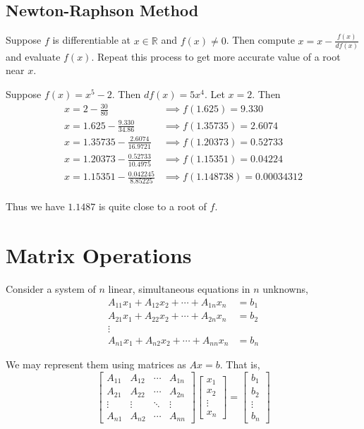 \subsection{Newton-Raphson Method}
	Suppose $f$ is differentiable at $x \in \mathbb{R}$ and $f(x) \ne 0$.
	Then compute $x = x - \frac{f(x)}{df(x)}$ and evaluate $f(x)$.
	Repeat this process to get more accurate value of a root near $x$.

\begin{remark}
	Suppose $f(x) = x^5 - 2$.
	Then $df(x) = 5x^4$.
	Let $x = 2$.
	Then
	\begin{align*}
		x = 2 - \frac{30}{80} & \implies f(1.625) = 9.330 \\
		x = 1.625 - \frac{9.330}{34.86} & \implies f(1.35735) = 2.6074 \\
		x = 1.35735 - \frac{2.6074}{16.9721} & \implies f(1.20373) = 0.52733 \\
		x = 1.20373 - \frac{0.52733}{10.4975} & \implies f(1.15351) = 0.04224 \\
		x = 1.15351 - \frac{0.042245}{8.85225} & \implies f(1.148738) = 0.00034312 \\
	\end{align*}

	Thus we have $1.1487$ is quite close to a root of $f$.
\end{remark}

\section{Matrix Operations}

	Consider a system of $n$ linear, simultaneous equations in $n$ unknowns,
	\begin{align*}
		A_{11}x_1 + A_{12}x_2 + \cdots + A_{1n}x_n & = b_1 \\
		A_{21}x_1 + A_{22}x_2 + \cdots + A_{2n}x_n & = b_2 \\
		\vdots \\
		A_{n1}x_1 + A_{n2}x_2 + \cdots + A_{nn}x_n & = b_n 
	\end{align*}

	We may represent them using matrices as $Ax = b$.
	That is,
	\[ \begin{bmatrix} A_{11} & A_{12} & \cdots & A_{1n} \\ A_{21} & A_{22} & \cdots & A_{2n} \\ \vdots & \vdots & \ddots & \vdots \\ A_{n1} & A_{n2} & \cdots & A_{nn} \end{bmatrix} \begin{bmatrix} x_1 \\ x_2 \\ \vdots \\ x_n \end{bmatrix} = \begin{bmatrix} b_1 \\ b_2 \\ \vdots \\ b_n \end{bmatrix} \]
		
